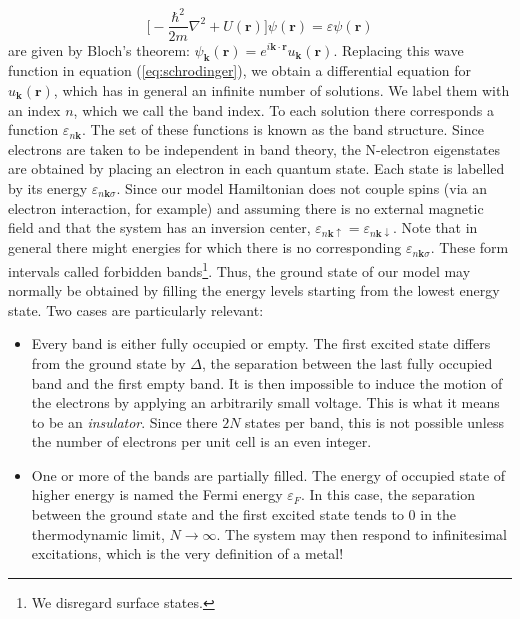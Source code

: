 \documentclass[10pt, twocolumn, twoside]{article}
\begin{document}
\begin{equation}\label{eq:schrodinger}
\bigg[ -\frac{\hbar^2}{2m} \nabla^2 + U(\bm r) \bigg] \psi (\bm r) = \varepsilon \psi (\bm r)
\end{equation}
are given by Bloch's theorem: $\psi_{\bm k} (\bm r) = e^{i\bm k \cdot \bm r} u_{\bm k} (\bm r)$. Replacing this wave function in equation (\ref{eq:schrodinger}), we obtain a differential equation for $u_{\bm k} (\bm r)$, which has in general an infinite number of solutions. We label them with an index $n$, which we call the band index. To each solution there corresponds a function $\varepsilon_{n\bm k}$. The set of these functions is known as the band structure. Since electrons are taken to be independent in band theory, the N-electron eigenstates are obtained by placing an electron in each quantum state. Each state is labelled by its energy $\varepsilon_{n\bm k \sigma}$. Since our model Hamiltonian does not couple spins (via an electron interaction, for example) and assuming there is no external magnetic field and that the system has an inversion center, $\varepsilon_{n\bm k \uparrow} = \varepsilon_{n\bm k \downarrow}$. Note that in general there might energies for which there is no corresponding $\varepsilon_{n\bm k \sigma}$. These form intervals called forbidden bands\footnote{We disregard surface states.}. Thus, the ground state of our model may normally be obtained by filling the energy levels starting from the lowest energy state. Two cases are particularly relevant:
\begin{itemize}
\item Every band is either fully occupied or empty. The first excited state differs from the ground state by $\Delta$, the separation between the last fully occupied band and the first empty band. It is then impossible to induce the motion of the electrons by applying an arbitrarily small voltage. This is what it means to be an \emph{insulator}. Since there $2N$ states per band, this is not possible unless the number of electrons per unit cell is an even integer.
\item One or more of the bands are partially filled. The energy of occupied state of higher energy is named the Fermi energy $\varepsilon_F$. In this case, the separation between the ground state and the first excited state tends to $0$ in the thermodynamic limit, $N \rightarrow \infty$. The system may then respond to infinitesimal excitations, which is the very definition of a metal!
\end{itemize}
\end{document}

